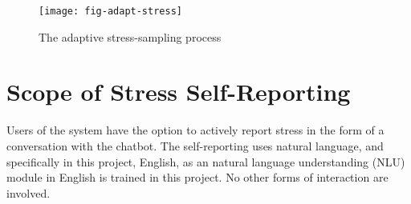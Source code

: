 \begin{figure}[ht]
  \caption{The adaptive stress-sampling process}
  \label{fig:adapt-stress}
  \centering
  \texttt{[image: fig-adapt-stress]}
\end{figure}

\section{Scope of Stress Self-Reporting}

Users of the system have the option to actively report stress in the form of a conversation with the chatbot. The self-reporting uses natural language, and specifically in this project, English, as an natural language understanding (NLU) module in English is trained in this project. No other forms of interaction are involved.
